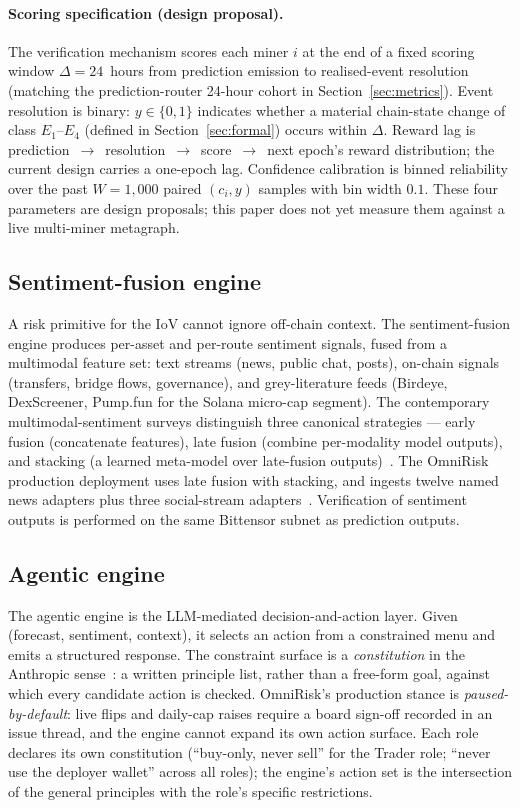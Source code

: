 \documentclass[11pt,a4paper]{article}
\begin{document}
\paragraph{Scoring specification (design proposal).} The verification
mechanism scores each miner $i$ at the end of a fixed scoring window
$\Delta = 24$~hours from prediction emission to realised-event resolution
(matching the prediction-router 24-hour cohort in Section~\ref{sec:metrics}).
Event resolution is binary: $y \in \{0,1\}$ indicates whether a
material chain-state change of class $E_1$--$E_4$ (defined in
Section~\ref{sec:formal}) occurs within $\Delta$. Reward lag is
prediction~$\to$~resolution~$\to$~score~$\to$~next epoch's reward
distribution; the current design carries a one-epoch lag. Confidence
calibration is binned reliability over the past $W = 1{,}000$ paired
$(c_i, y)$ samples with bin width $0.1$. These four parameters are
design proposals; this paper does not yet measure them against a live
multi-miner metagraph.

\subsection*{Sentiment-fusion engine}

A risk primitive for the IoV cannot ignore off-chain context. The
sentiment-fusion engine produces per-asset and per-route sentiment
signals, fused from a multimodal feature set: text streams (news, public
chat, posts), on-chain signals (transfers, bridge flows, governance), and
grey-literature feeds (Birdeye, DexScreener, Pump.fun for the Solana
micro-cap segment). The contemporary multimodal-sentiment surveys
distinguish three canonical strategies --- early fusion (concatenate
features), late fusion (combine per-modality model outputs), and stacking
(a learned meta-model over late-fusion outputs)~\cite{lai2023multimodal,
gandhi2023multimodal,zhang2025sentistack}. The OmniRisk production
deployment uses late fusion with stacking, and ingests
twelve named news adapters plus three social-stream
adapters~\cite{omnirisk2026systemdesign}. Verification of sentiment
outputs is performed on the same Bittensor subnet as prediction outputs.

\subsection*{Agentic engine}

The agentic engine is the LLM-mediated decision-and-action layer. Given
(forecast, sentiment, context), it selects an action from a constrained
menu and emits a structured response. The constraint surface is a
\emph{constitution} in the Anthropic sense~\cite{bai2022constitutional}:
a written principle list, rather than a free-form goal, against which
every candidate action is checked. OmniRisk's production stance is
\emph{paused-by-default}: live flips and daily-cap raises require a
board sign-off recorded in an issue thread, and the engine cannot expand
its own action surface. Each role declares its own constitution
(``buy-only, never sell'' for the Trader role; ``never use the deployer
wallet'' across all roles); the engine's action set is the intersection
of the general principles with the role's specific restrictions.
\end{document}
